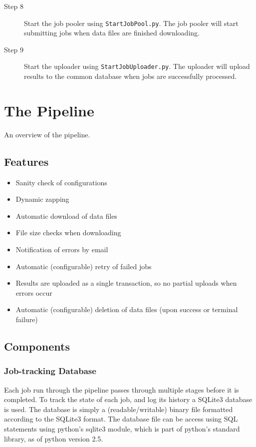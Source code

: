 \begin{description}
    \item[Step 8] Start the job pooler using \texttt{StartJobPool.py}. The job pooler will start submitting jobs when data files are finished downloading. 

    \item[Step 9] Start the uploader using \texttt{StartJobUploader.py}. The uploader will upload results to the common database when jobs are successfully processed.
\end{description}


\section{The Pipeline}
An overview of the pipeline.

\subsection{Features}
\begin{itemize}
    \item Sanity check of configurations
    \item Dynamic zapping
    \item Automatic download of data files
    \item File size checks when downloading
    \item Notification of errors by email
    \item Automatic (configurable) retry of failed jobs
    \item Results are uploaded as a single transaction, so no partial uploads when errors occur
    \item Automatic (configurable) deletion of data files (upon success or terminal failure)
\end{itemize}


\subsection{Components}
\subsubsection{Job-tracking Database}
Each job run through the pipeline passes through multiple stages before it is completed. To track the state of each job, and log its history a SQLite3 database is used. The database is simply a (readable/writable) binary file formatted according to the SQLite3 format. The database file can be access using SQL statements using python's sqlite3 module, which is part of python's standard library, as of python version 2.5.

